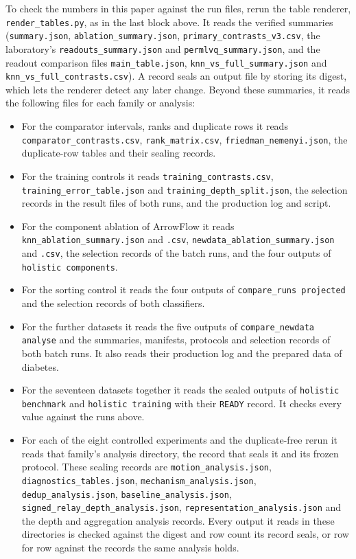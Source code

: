 {\raggedright\setlength{\parindent}{1.5em} To check the numbers in this paper against the run files, rerun the table renderer, \texttt{render\_tables.py}, as in the last block above. It reads the verified summaries (\texttt{summary.json}, \texttt{ablation\_summary.json}, \texttt{primary\_contrasts\_v3.csv}, the laboratory's \texttt{readouts\_summary.json} and \texttt{permlvq\_summary.json}, and the readout comparison files \texttt{main\_table.json}, \texttt{knn\_vs\_full\_summary.json} and \texttt{knn\_vs\_full\_contrasts.csv}). A record seals an output file by storing its digest, which lets the renderer detect any later change. Beyond these summaries, it reads the following files for each family or analysis:
\begin{itemize}[leftmargin=2em,topsep=2pt,itemsep=1pt]
\item For the comparator intervals, ranks and duplicate rows it reads \texttt{comparator\_contrasts.csv}, \texttt{rank\_matrix.csv}, \texttt{friedman\_nemenyi.json}, the duplicate-row tables and their sealing records.
\item For the training controls it reads \texttt{training\_contrasts.csv}, \texttt{training\_error\_table.json} and \texttt{training\_depth\_split.json}, the selection records in the result files of both runs, and the production log and script.
\item For the component ablation of ArrowFlow it reads \texttt{knn\_ablation\_summary.json} and \texttt{.csv}, \texttt{newdata\_ablation\_summary.json} and \texttt{.csv}, the selection records of the batch runs, and the four outputs of \texttt{holistic components}.
\item For the sorting control it reads the four outputs of \texttt{compare\_runs projected} and the selection records of both classifiers.
\item For the further datasets it reads the five outputs of \texttt{compare\_newdata analyse} and the summaries, manifests, protocols and selection records of both batch runs. It also reads their production log and the prepared data of diabetes.
\item For the seventeen datasets together it reads the sealed outputs of \texttt{holistic benchmark} and \texttt{holistic training} with their \texttt{READY} record. It checks every value against the runs above.
\item For each of the eight controlled experiments and the duplicate-free rerun it reads that family's analysis directory, the record that seals it and its frozen protocol. These sealing records are \texttt{motion\_analysis.json}, \texttt{diagnostics\_tables.json}, \texttt{mechanism\_analysis.json}, \texttt{dedup\_analysis.json}, \texttt{baseline\_analysis.json}, \texttt{signed\_relay\_depth\_analysis.json}, \texttt{representation\_analysis.json} and the depth and aggregation analysis records. Every output it reads in these directories is checked against the digest and row count its record seals, or row for row against the records the same analysis holds.

\end{itemize}}
